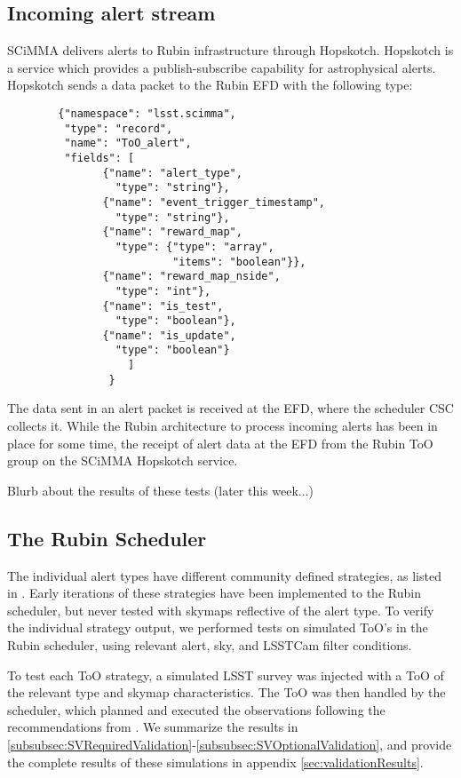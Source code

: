 \subsection{Incoming alert stream}\label{subsec:alertStream verification}

SCiMMA delivers alerts to Rubin infrastructure through Hopskotch. Hopskotch is a service which provides a publish-subscribe capability for astrophysical alerts. Hopskotch sends a data packet to the Rubin EFD with the following type:

\begin{lstlisting}
        {"namespace": "lsst.scimma",
         "type": "record",
         "name": "ToO_alert",
         "fields": [
               {"name": "alert_type",
                 "type": "string"},
               {"name": "event_trigger_timestamp",
                 "type": "string"},
               {"name": "reward_map",
                 "type": {"type": "array",
                          "items": "boolean"}},
               {"name": "reward_map_nside",
                 "type": "int"},
               {"name": "is_test",
                 "type": "boolean"},
               {"name": "is_update",
                 "type": "boolean"}
                   ]
                }
\end{lstlisting}

The data sent in an alert packet is received at the EFD, where the scheduler CSC collects it. While the Rubin architecture to process incoming alerts has been in place for some time, the receipt of alert data at the EFD from the Rubin ToO group on the SCiMMA Hopskotch service.

Blurb about the results of these tests (later this week...)

\subsection{The Rubin Scheduler}\label{subsec:Scheduler verification}

The individual alert types have different community defined strategies, as listed in \cite{RubinToO2024}. Early iterations of these strategies have been implemented to the Rubin scheduler, but never tested with skymaps reflective of the alert type. To verify the individual strategy output, we performed tests on simulated ToO's in the Rubin scheduler, using relevant alert, sky, and LSSTCam filter conditions.

To test each ToO strategy, a simulated LSST survey was injected with a ToO of the relevant type and skymap characteristics. The ToO was then handled by the scheduler, which planned and executed the observations following the recommendations from \cite{RubinToO2024}. We summarize the results in \ref{subsubsec:SVRequiredValidation}-\ref{subsubsec:SVOptionalValidation}, and provide the complete results of these simulations in appendix \ref{sec:validationResults}.

